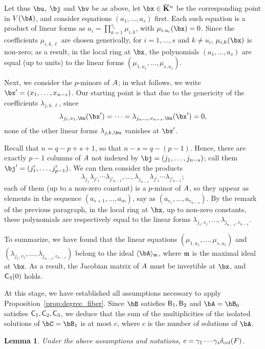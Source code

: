 \documentclass[12pt]{article}
\newtheorem{lemma}[definition]{Lemma}
\begin{document}
Let thus $\bu$, $\bj$ and $\bv$ be as above, let $\bx \in \KKbar{}^n$
be the corresponding point in $V(\bA)$, and consider equations
$(a_1,\dots,a_s)$ first. Each such equation is a product of linear forms
as $a_i=\prod_{k=1}^{\gamma_i} \mu_{i,k}$, with $\mu_{i,u_i}(\bx)=0$.
Since the coefficients $\mu_{i,k,\ell}$ are chosen generically, for
$i=1,\dots,s$ and $k \ne u_i$, $\mu_{i,k}(\bx)$ is non-zero; as a
result, in the local ring at $\bx$, the polynomials $(a_1,\dots,a_s)$
are equal (up to units) to the linear forms
$(\mu_{1,u_1},\dots,\mu_{s,u_s})$.

Next, we consider the $p$-minors of ${A}$; in what follows, we 
write $\bx'=(x_1,\dots,x_{n-s})$. Our starting point is that due to 
the genericity of the coefficients $\lambda_{j,k,\ell}$, since 
$$\lambda_{j_1,v_1,\bu}(\bx')=\cdots=\lambda_{j_{n-s},v_{n-s},\bu}(\bx')=0,$$ 
none of the other linear forms $\lambda_{j,k,\bu}$ vanishes at $\bx'$.

Recall that $n=q-p+s+1$, so that $n-s = q-(p-1)$. Hence, there are
exactly $p-1$ columns of ${A}$ not indexed by $\bj=(j_1,\dots,j_{n-s})$; call
them $\bj'=(j'_1,\dots,j'_{p-1})$. We can then consider the 
products
$$ \lambda_{j_1} \lambda_{j'_1} \cdots \lambda_{j'_{p-1}},\dots, \lambda_{j_{n-s}}
\lambda_{j'_1} \cdots \lambda_{j'_{p-1}};$$ each of them (up to a non-zero
constant) is a $p$-minor of ${A}$, so they appear as elements in the
sequence $(a_{s+1},\dots,a_m)$, say as
$(a_{e_1},\dots,a_{e_{n-s}})$. By the remark of the previous
paragraph, in the local ring at $\bx$, up to non-zero constants, these
polynomials are respectively equal to the linear forms
$\lambda_{j_1,v_1},\dots,\lambda_{j_{n-s},v_{n-s}}$.  

To summarize, we have found that the linear equations
$(\mu_{1,u_1},\dots,\mu_{s,u_s})$ and
$(\lambda_{j_1,v_1},\dots,\lambda_{j_{n-s},v_{n-s}})$ belong to the
ideal $\langle \bA \rangle_\m$, where $\mathfrak{m}$ is the maximal ideal at
$\bx$. As a result, the Jacobian matrix of ${A}$ must be invertible
at $\bx$, and $\mathsf{C}_3(0)$ holds.


\medskip

At this stage, we have established all assumptions necessary to apply
Proposition~\ref{prop:degree_fiber}. Since $\bB$ satisfies
$\mathsf{B}_1,\mathsf{B}_2$ and $\bA=\bB_0$ satisfies $\mathsf{C}_1,\mathsf{C}_2,\mathsf{C}_3$,
we deduce that the sum of the multiplicities of the isolated solutions
of $\bC=\bB_1$ is at most $c$, where $c$ is the number of solutions of
$\bA$. 

\begin{lemma}\label{lemma:column:c_estimate}
  Under the above assumptions and notations, $c=\gamma_1\cdots
\gamma_s \delta_{\rm col}({F})$. 
\end{lemma}
\end{document}
